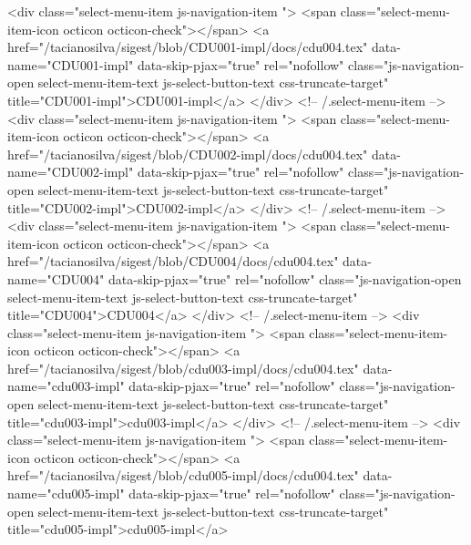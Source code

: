             <div class="select-menu-item js-navigation-item ">
              <span class="select-menu-item-icon octicon octicon-check"></span>
              <a href="/tacianosilva/sigest/blob/CDU001-impl/docs/cdu004.tex"
                 data-name="CDU001-impl"
                 data-skip-pjax="true"
                 rel="nofollow"
                 class="js-navigation-open select-menu-item-text js-select-button-text css-truncate-target"
                 title="CDU001-impl">CDU001-impl</a>
            </div> <!-- /.select-menu-item -->
            <div class="select-menu-item js-navigation-item ">
              <span class="select-menu-item-icon octicon octicon-check"></span>
              <a href="/tacianosilva/sigest/blob/CDU002-impl/docs/cdu004.tex"
                 data-name="CDU002-impl"
                 data-skip-pjax="true"
                 rel="nofollow"
                 class="js-navigation-open select-menu-item-text js-select-button-text css-truncate-target"
                 title="CDU002-impl">CDU002-impl</a>
            </div> <!-- /.select-menu-item -->
            <div class="select-menu-item js-navigation-item ">
              <span class="select-menu-item-icon octicon octicon-check"></span>
              <a href="/tacianosilva/sigest/blob/CDU004/docs/cdu004.tex"
                 data-name="CDU004"
                 data-skip-pjax="true"
                 rel="nofollow"
                 class="js-navigation-open select-menu-item-text js-select-button-text css-truncate-target"
                 title="CDU004">CDU004</a>
            </div> <!-- /.select-menu-item -->
            <div class="select-menu-item js-navigation-item ">
              <span class="select-menu-item-icon octicon octicon-check"></span>
              <a href="/tacianosilva/sigest/blob/cdu003-impl/docs/cdu004.tex"
                 data-name="cdu003-impl"
                 data-skip-pjax="true"
                 rel="nofollow"
                 class="js-navigation-open select-menu-item-text js-select-button-text css-truncate-target"
                 title="cdu003-impl">cdu003-impl</a>
            </div> <!-- /.select-menu-item -->
            <div class="select-menu-item js-navigation-item ">
              <span class="select-menu-item-icon octicon octicon-check"></span>
              <a href="/tacianosilva/sigest/blob/cdu005-impl/docs/cdu004.tex"
                 data-name="cdu005-impl"
                 data-skip-pjax="true"
                 rel="nofollow"
                 class="js-navigation-open select-menu-item-text js-select-button-text css-truncate-target"
                 title="cdu005-impl">cdu005-impl</a>
